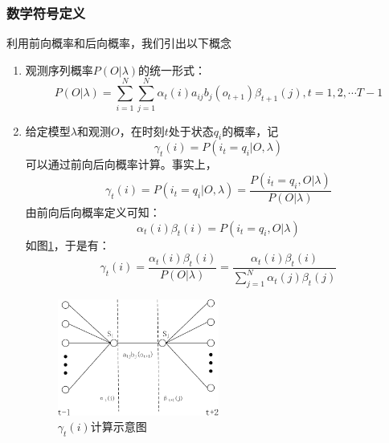         \subsubsection{数学符号定义}
        利用前向概率和后向概率，我们引出以下概念
        \begin{enumerate}
            \item 观测序列概率$P(O|\lambda )$的统一形式：
                \begin{equation}
                    P(O|\lambda ) = \sum\limits_{i = 1}^N {\sum\limits_{j = 1}^N {{\alpha _t}(i)} {a_{ij}}{b_j}({o_{t + 1}}){\beta _{t + 1}}\left( j \right),} t = 1,2, \cdots T - 1
                \end{equation}
            \item 给定模型$\lambda $和观测$O$，在时刻$t$处于状态$q_i$的概率，记
                \begin{equation}
                    {\gamma _t}(i) = P({i_t} = {q_i}|O,\lambda )
                \end{equation}
                可以通过前向后向概率计算。事实上，
                \[{\gamma _t}(i) = P({i_t} = {q_i}|O,\lambda ) = \frac{{P({i_t} = {q_i},O|\lambda )}}{{P(O|\lambda )}}\]
                由前向后向概率定义可知：
                \[{\alpha _t}(i){\beta _t}(i) = P({i_t} = {q_i},O|\lambda )\]
                如图\ref{fig:gamma}，于是有：
                \begin{equation}\label{equation:gamma}
                {\gamma _t}(i) = \frac{{{\alpha _t}(i){\beta _t}(i)}}{{P(O|\lambda )}} = \frac{{{\alpha _t}(i){\beta _t}(i)}}{{\sum\limits_{j = 1}^N {{\alpha _t}(j){\beta _t}(j)} }}
                \end{equation}

                \begin{figure}[htbp]
                \centering
                \includegraphics[width=0.5\textwidth]{figures/chapter2/gamma-crop}
                \caption{${\gamma _t}(i)$计算示意图}
                \label{fig:gamma}
                \end{figure}


\end{enumerate}
